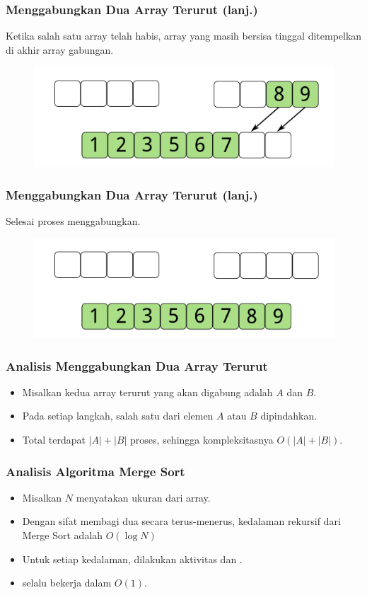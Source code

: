 \begin{frame}
\frametitle{Menggabungkan Dua Array Terurut (lanj.)}
Ketika salah satu array telah habis, array yang masih bersisa tinggal ditempelkan di akhir array gabungan.
\begin{figure}
  \centering
  \includegraphics[width=10 cm]{asset/merge-array-pair-8.pdf}
\end{figure}
\end{frame}

\begin{frame}
\frametitle{Menggabungkan Dua Array Terurut (lanj.)}
Selesai proses menggabungkan.
\begin{figure}
  \centering
  \includegraphics[width=10 cm]{asset/merge-array-pair-9.pdf}
\end{figure}
\end{frame}

\begin{frame}
\frametitle{Analisis Menggabungkan Dua Array Terurut}
\begin{itemize}
  \item Misalkan kedua array terurut yang akan digabung adalah $A$ dan $B$.
  \item Pada setiap langkah, salah satu dari elemen $A$ atau $B$ dipindahkan.
  \item Total terdapat $|A| + |B|$ proses, sehingga kompleksitasnya $O(|A| + |B|)$.
\end{itemize}
\end{frame}

\begin{frame}
\frametitle{Analisis Algoritma Merge Sort}
\begin{itemize}
  \item Misalkan $N$ menyatakan ukuran dari array.
  \item Dengan sifat membagi dua secara terus-menerus, kedalaman rekursif dari Merge Sort adalah $O(\log{N})$
  \item Untuk setiap kedalaman, dilakukan aktivitas  dan .
  \item {} selalu bekerja dalam $O(1)$.
\end{itemize}
\end{frame}

